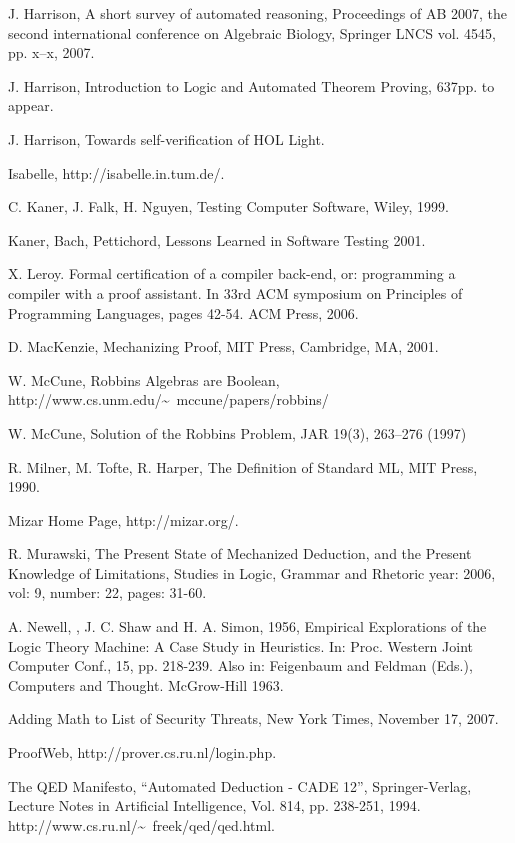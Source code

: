 \documentclass{llncs}
\begin{document}
\begin{thebibliography}{A}
 J. Harrison, A short survey of automated reasoning,
Proceedings of AB 2007, the second international conference on Algebraic Biology, Springer LNCS vol. 4545, pp. x--x, 2007.

 J. Harrison, Introduction to Logic and Automated
Theorem Proving, 637pp. to appear.

 J. Harrison, Towards self-verification of HOL Light.

 Isabelle, http://isabelle.in.tum.de/.


 C. Kaner, J. Falk, H. Nguyen, Testing Computer
Software, Wiley, 1999.  

 Kaner, Bach, Pettichord,
Lessons Learned in Software Testing 2001.

X. Leroy. Formal certification of a compiler back-end, or:
programming a compiler with a proof assistant. In 33rd ACM symposium
on Principles of Programming Languages, pages 42-54. ACM Press, 2006.

 D. MacKenzie, Mechanizing Proof, MIT Press, Cambridge, MA,
2001.

 W. McCune, Robbins Algebras are Boolean, http://www.cs.unm.edu/\~~mccune/papers/robbins/

 W. McCune, Solution of the Robbins Problem, JAR 19(3), 263--276 (1997)

 R. Milner, M. Tofte, R. Harper, The Definition of Standard ML, MIT Press, 1990.

 Mizar Home Page, http://mizar.org/.

 R. Murawski, The Present State of Mechanized
Deduction, and the Present Knowledge of Limitations,
Studies in Logic, Grammar and Rhetoric 
year: 2006, vol: 9, number: 22, pages: 31-60.

 A. Newell, , J. C. Shaw and H. A. Simon, 1956, Empirical Explorations of the Logic Theory Machine: A Case Study in Heuristics. In: Proc. Western Joint Computer Conf., 15, pp. 218-239. Also in: Feigenbaum and Feldman (Eds.), Computers and Thought. McGrow-Hill 1963.

 Adding Math to List of Security Threats, New York Times, November 17, 2007.


 ProofWeb, http://prover.cs.ru.nl/login.php.

 The QED Manifesto, ``Automated Deduction - CADE 12'', Springer-Verlag, Lecture Notes in Artificial Intelligence, Vol. 814, pp. 238-251, 1994.
http://www.cs.ru.nl/\~~freek/qed/qed.html.

\end{thebibliography}
\end{document}
